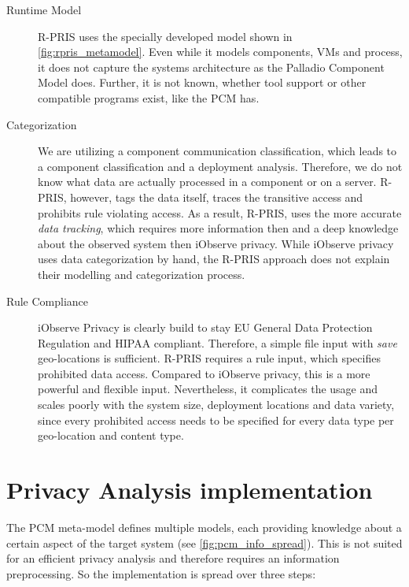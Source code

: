 \begin{description}
	\item[Runtime Model] R-PRIS uses the specially developed model shown in \autoref{fig:rpris_metamodel}. Even while it models components, VMs and process, it does not capture the systems architecture as the Palladio Component Model does. Further, it is not known, whether tool support or other compatible programs exist, like the PCM has. 
\end{description}

\begin{description}
	\item[Categorization] We are utilizing a component communication classification, which leads to a component classification and a deployment analysis. Therefore, we do not know what data are actually processed in a component or on a server. R-PRIS, however, tags the data itself, traces the transitive access and prohibits rule violating access. As a result, R-PRIS, uses the more accurate \textit{data tracking}, which requires more information then and a deep knowledge about the observed system then iObserve privacy. While iObserve privacy uses data categorization by hand, the R-PRIS approach does not explain their modelling and categorization process.
\end{description}

\begin{description}
	\item[Rule Compliance] iObserve Privacy is clearly build to stay EU General Data Protection Regulation and HIPAA compliant. Therefore, a simple file input with \textit{save} geo-locations is sufficient. R-PRIS requires a rule input, which specifies prohibited data access. Compared to iObserve privacy, this is a more powerful and flexible input. Nevertheless, it complicates the usage and scales poorly with the system size, deployment locations and data variety, since every prohibited access needs to be specified for every data type per geo-location and content type.
\end{description}



\section{Privacy Analysis implementation}
\label{sec:PrivacyAnalysis:implementation}

The PCM meta-model defines multiple models, each providing knowledge about a certain aspect of the target system (see \autoref{fig:pcm_info_spread}). This is not suited for an efficient privacy analysis and therefore requires an information preprocessing. So the implementation is spread over three steps:


